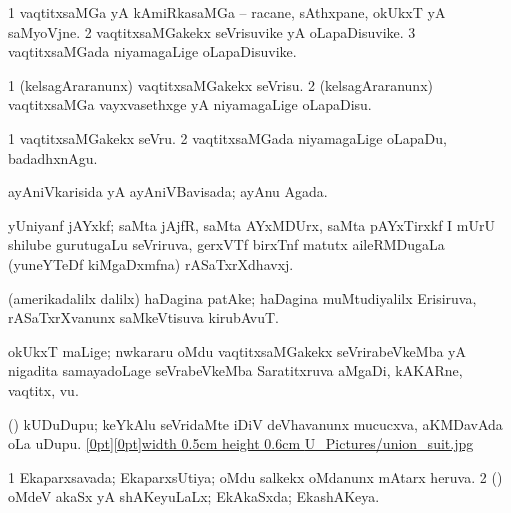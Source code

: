 {{\bentry
{} 
\gl{\nA}
\expl{}
\bmng
\bnum
\num{1} vaqtitxsaMGa yA kAmiRkasaMGa -- racane, sAthxpane, okUkxT yA saMyoVjne. 
\num{2} vaqtitxsaMGakekx seVrisuvike yA oLapaDisuvike. 
\num{3} vaqtitxsaMGada niyamagaLige oLapaDisuvike. 
\enum
\emng
\eentry

\bentry
{} 
\gl{\sakirx}
\expl{}
\bmng
\bnum
\num{1} (kelsagAraranunx) vaqtitxsaMGakekx seVrisu. 
\num{2} (kelsagAraranunx) vaqtitxsaMGa vayxvasethxge yA niyamagaLige oLapaDisu. 
\enum
\emng

\noindent
\gl{\akirx}
\expl{}
\bmng
\bnum
\num{1} vaqtitxsaMGakekx seVru. 
\num{2} vaqtitxsaMGada niyamagaLige oLapaDu, badadhxnAgu. 
\enum
\emng
\eentry

\bentry
{} 
\gl{\gu}
\expl{}
\bmng
ayAniVkarisida yA ayAniVBavisada; ayAnu Agada. 
\emng
\eentry

\bentry
{} 
\pron{}
\gl{\nA}
\expl{}
\bmng
yUniyanf jAYxkf; saMta jAjfR, saMta AYxMDUrx, saMta pAYxTirxkf I mUrU shilube gurutugaLu seVriruva, gerxVTf birxTnf matutx aileRMDugaLa (yuneYTeDf kiMgaDxmfna) rASaTxrXdhavxj. 
\emng
\eentry

\bentry
{} 
\pron{}
\gl{\nA}
\expl{}
\bmng
(amerikadalilx dalilx) haDagina patAke; haDagina muMtudiyalilx Erisiruva, rASaTxrXvanunx saMkeVtisuva kirubAvuT. 
\emng
\eentry

\bentry
{}
\gl{\nA}
\expl{}
\bmng
okUkxT maLige; nwkararu oMdu vaqtitxsaMGakekx seVrirabeVkeMba yA nigadita samayadoLage seVrabeVkeMba Saratitxruva aMgaDi, kAKARne, vaqtitx, \mo vu. 
\emng
\eentry

\bentry
{}
\gl{\nA}
\expl{}
\bmng
(\ame) kUDuDupu; keYkAlu seVridaMte iDiV deVhavanunx mucucxva, aKMDavAda oLa uDupu. \quad\hyperlink{union_suitfigure}{\raisebox{-0.15cm}[0pt][0pt]{\pdfimage width 0.5cm height 0.6cm {U_Pictures/union_suit.jpg}}} 
\emng
\eentry

\bentry
{} 
\gl{\nA}
\expl{}
\bmng
{} 
\emng
\eentry

\bentry
{} 
\gl{\gu}
\expl{}
\bmng
\bnum
\num{1} Ekaparxsavada; EkaparxsUtiya; oMdu salkekx oMdanunx mAtarx heruva. 
\num{2} (\savi) oMdeV akaSx yA shAKeyuLaLx; EkAkaSxda; EkashAKeya. 
\enum
\emng
\eentry

}}
